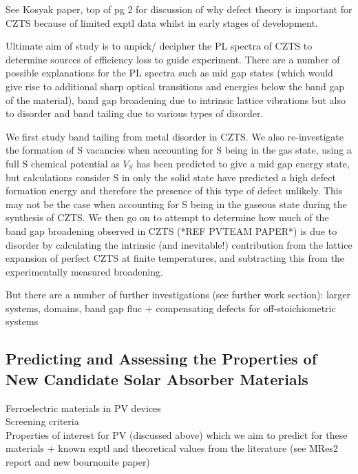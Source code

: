 See Kosyak paper, top of pg 2 for discussion of why defect theory is important for CZTS because of limited exptl data whilst in early stages of development.

Ultimate aim of study is to unpick/ decipher the PL spectra of CZTS to determine sources of efficiency loss to guide experiment. There are a number of possible explanations for the PL spectra such as mid gap states (which would give rise to additional sharp optical transitions and energies below the band gap of the material),  band gap broadening due to intrinsic lattice vibrations but also to disorder and band tailing due to various types of disorder.

We first study band tailing from metal disorder in CZTS. We also re-investigate the formation of S vacancies when accounting for S being in the gas state, using a full S chemical potential as $V_S$ has been predicted to give a mid gap energy state, but calculations consider S in only the solid state have predicted a high defect formation energy and therefore the presence of this type of defect unlikely. This may not be the case when accounting for S being in the gaseous state during the synthesis of CZTS.
We then go on to attempt to determine how much of the band gap broadening observed in CZTS (*REF PVTEAM PAPER*) is due to disorder by calculating the intrinsic (and inevitable!) contribution from the lattice expansion of perfect CZTS at finite temperatures, and subtracting this from the experimentally measured broadening.
 
But there are a number of further investigations (see further work section): larger systems, domains, band gap fluc + compensating defects for off-stoichiometric systems


\subsection{Predicting and Assessing the Properties of New Candidate Solar Absorber Materials}
Ferroelectric materials in PV devices\\
Screening criteria\\
Properties of interest for PV (discussed above) which we aim to predict for these materials + known exptl and theoretical values from the literature (see MRes2 report and new bournonite paper)



